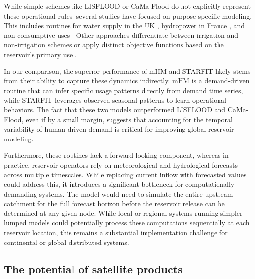 \documentclass[hess, manuscript]{copernicus}
\begin{document}
While simple schemes like LISFLOOD or CaMa-Flood do not explicitly represent these operational rules, several studies have focused on purpose-specific modeling. This includes routines for water supply in the UK \citep{Salwey2024}, hydropower in France \citep{Baratgin2024}, and non-consumptive uses \citep{Shrestha2024}. Other approaches differentiate between irrigation and non-irrigation schemes \citep{Hanasaki2006, Sadki2023} or apply distinct objective functions based on the reservoir's primary use \citep{Haddeland2006}. 

In our comparison, the superior performance of mHM and STARFIT likely stems from their ability to capture these dynamics indirectly. mHM is a demand-driven routine that can infer specific usage patterns directly from demand time series, while STARFIT leverages observed seasonal patterns to learn operational behaviors. The fact that these two models outperformed LISFLOOD and CaMa-Flood, even if by a small margin, suggests that accounting for the temporal variability of human-driven demand is critical for improving global reservoir modeling.

Furthermore, these routines lack a forward-looking component, whereas in practice, reservoir operators rely on meteorological and hydrological forecasts across multiple timescales. While replacing current inflow with forecasted values could address this, it introduces a significant bottleneck for computationally demanding systems. The model would need to simulate the entire upstream catchment for the full forecast horizon before the reservoir release can be determined at any given node. While local or regional systems running simpler lumped models could potentially process these computations sequentially at each reservoir location, this remains a substantial implementation challenge for continental or global distributed systems. 

\subsection{The potential of satellite products}
\label{sec:satellite_products}
\end{document}
